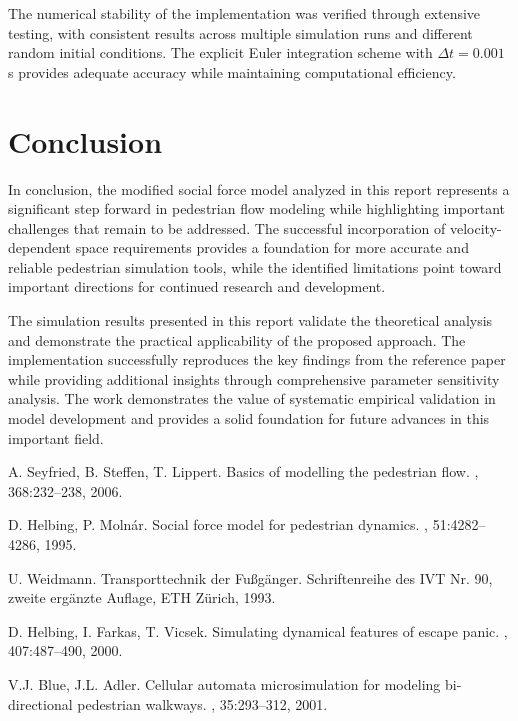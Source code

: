 \documentclass[12pt,a4paper]{article}
\begin{document}
The numerical stability of the implementation was verified through extensive testing, with consistent results across multiple simulation runs and different random initial conditions. The explicit Euler integration scheme with $\Delta t = 0.001$ s provides adequate accuracy while maintaining computational efficiency.

\section{Conclusion}

In conclusion, the modified social force model analyzed in this report represents a significant step forward in pedestrian flow modeling while highlighting important challenges that remain to be addressed. The successful incorporation of velocity-dependent space requirements provides a foundation for more accurate and reliable pedestrian simulation tools, while the identified limitations point toward important directions for continued research and development.

The simulation results presented in this report validate the theoretical analysis and demonstrate the practical applicability of the proposed approach. The implementation successfully reproduces the key findings from the reference paper while providing additional insights through comprehensive parameter sensitivity analysis. The work demonstrates the value of systematic empirical validation in model development and provides a solid foundation for future advances in this important field.


\begin{thebibliography}{99}

A. Seyfried, B. Steffen, T. Lippert.
\newblock Basics of modelling the pedestrian flow.
, 368:232--238, 2006.

D. Helbing, P. Molnár.
\newblock Social force model for pedestrian dynamics.
, 51:4282--4286, 1995.

U. Weidmann.
\newblock Transporttechnik der Fußgänger.
\newblock Schriftenreihe des IVT Nr. 90, zweite ergänzte Auflage, ETH Zürich, 1993.

D. Helbing, I. Farkas, T. Vicsek.
\newblock Simulating dynamical features of escape panic.
, 407:487--490, 2000.

V.J. Blue, J.L. Adler.
\newblock Cellular automata microsimulation for modeling bi-directional pedestrian walkways.
, 35:293--312, 2001.

\end{thebibliography}
\end{document}
